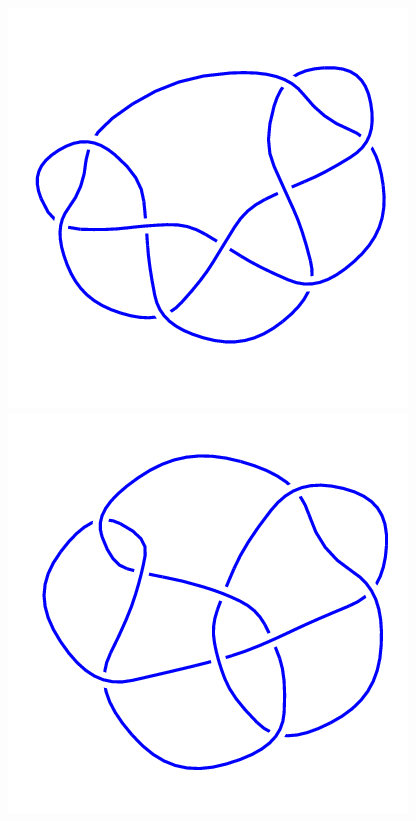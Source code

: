 \begin{figure}[H]
	\begin{minipage}[b]{.18\linewidth}
		\centering
		\includegraphics[width=\linewidth]{../data/9_31.png}
	\end{minipage}
	\begin{minipage}[b]{.18\linewidth}
		\centering
		\includegraphics[width=\linewidth]{../data/9_32.png}

\end{minipage}
\end{figure}
